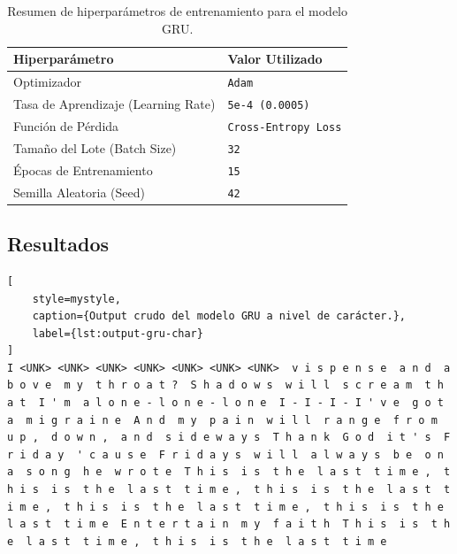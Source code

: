 \begin{table}[h!]
    \centering
    \caption{Resumen de hiperparámetros de entrenamiento para el modelo GRU.}
    \label{tab:gru_hyperparams}
    \begin{tabular}{l|l}
        \hline
        \textbf{Hiperparámetro} & \textbf{Valor Utilizado} \\ \hline
        Optimizador & \texttt{Adam} \\
        Tasa de Aprendizaje (Learning Rate) & \texttt{5e-4 (0.0005)} \\
        Función de Pérdida & \texttt{Cross-Entropy Loss} \\
        Tamaño del Lote (Batch Size) & \texttt{32} \\
        Épocas de Entrenamiento & \texttt{15} \\
        Semilla Aleatoria (Seed) & \texttt{42} \\ \hline
    \end{tabular}
\end{table}

\subsection{Resultados}

\begin{lstlisting}[
    style=mystyle,
    caption={Output crudo del modelo GRU a nivel de carácter.},
    label={lst:output-gru-char}
]
I <UNK> <UNK> <UNK> <UNK> <UNK> <UNK> <UNK>  v i s p e n s e  a n d  a b o v e  m y  t h r o a t ?  S h a d o w s  w i l l  s c r e a m  t h a t  I ' m  a l o n e - l o n e - l o n e  I - I - I - I ' v e  g o t  a  m i g r a i n e  A n d  m y  p a i n  w i l l  r a n g e  f r o m  u p ,  d o w n ,  a n d  s i d e w a y s  T h a n k  G o d  i t ' s  F r i d a y  ' c a u s e  F r i d a y s  w i l l  a l w a y s  b e  o n  a  s o n g  h e  w r o t e  T h i s  i s  t h e  l a s t  t i m e ,  t h i s  i s  t h e  l a s t  t i m e ,  t h i s  i s  t h e  l a s t  t i m e ,  t h i s  i s  t h e  l a s t  t i m e ,  t h i s  i s  t h e  l a s t  t i m e  E n t e r t a i n  m y  f a i t h  T h i s  i s  t h e  l a s t  t i m e ,  t h i s  i s  t h e  l a s t  t i m e
\end{lstlisting}

